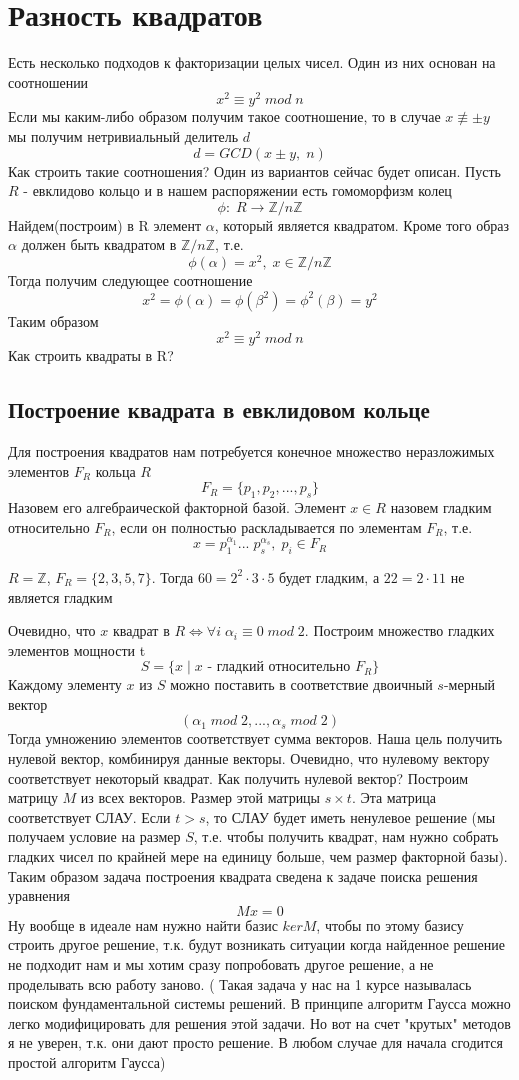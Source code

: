 \documentclass[oneside,final,14pt]{extreport}
\theoremstyle{plain}
\begin{document}
\chapter{Разность квадратов}
Есть несколько подходов к факторизации целых чисел. Один из них основан на соотношении $$x^2 \equiv y^2 \; mod \; n$$
Если мы каким-либо образом получим такое соотношение, то в случае $x \not \equiv \pm y$ мы получим нетривиальный делитель $d$
$$d=GCD(x \pm y,\; n)$$
Как строить такие соотношения? Один из вариантов сейчас будет описан. Пусть $R$ - евклидово кольцо и в нашем распоряжении есть гомоморфизм колец
$$
\phi: \; R \rightarrow {\mathbb{Z}}/{{n\mathbb{Z}}}
$$
Найдем(построим) в R элемент $\alpha$, который является квадратом. Кроме того образ $\alpha$ должен быть квадратом в $\mathbb{Z}/n\mathbb{Z}$, т.е. $$\phi(\alpha)=x^2,\; x \in \mathbb{Z}/n\mathbb{Z}$$
Тогда получим следующее соотношение
$$x^2=\phi(\alpha)=\phi(\beta^2)=\phi^2(\beta)=y^2$$
Таким образом $$x^2 \equiv y^2 \; mod \; n$$
Как строить квадраты в R?
\section{Построение квадрата в евклидовом кольце}
Для построения квадратов нам потребуется конечное множество неразложимых элементов $F_R$ кольца $R$
$$F_R=\{p_1,p_2,...,p_s\}$$ Назовем его алгебраической факторной базой. Элемент $x \in R$ назовем гладким относительно $F_R$, если он полностью раскладывается по элементам  $F_R$, т.е.
$$x=p_1^{\alpha_1}...\;p_s^{\alpha_s}, \; p_i \in F_R$$
\begin{remark*}
$R=\mathbb{Z}$,  $F_R=\{2,3,5,7\}$. Тогда $60=2^2 \cdot 3 \cdot 5$ будет гладким, а $22=2 \cdot 11$ не является гладким\end{remark*}Очевидно, что $x$ квадрат в $R \Leftrightarrow \forall i \;\alpha_i \equiv 0 \; mod \; 2$. Построим множество гладких элементов мощности t
$$S=\{x \; | \; x\text{ - гладкий относительно }F_R\}$$
Каждому элементу $x$ из $S$ можно поставить в соответствие двоичный $s$-мерный вектор
$$(\alpha_1 \; mod \; 2,...,\alpha_s \; mod \; 2)$$ Тогда умножению элементов соответствует сумма векторов. Наша цель получить нулевой вектор, комбинируя данные векторы. Очевидно, что нулевому вектору соответствует некоторый квадрат. Как получить нулевой вектор?
Построим матрицу $M$ из всех векторов. Размер этой матрицы $s \times t$. Эта матрица соответствует СЛАУ. Если $t>s$, то СЛАУ будет иметь ненулевое решение (мы получаем условие на размер $S$, т.е. чтобы получить квадрат, нам нужно собрать гладких чисел по крайней мере на единицу больше, чем размер факторной базы).
Таким образом задача построения квадрата сведена к задаче поиска решения уравнения $$Mx=0$$
Ну вообще в идеале нам нужно найти базис $ker M$, чтобы по этому базису строить другое решение, т.к. будут возникать ситуации когда найденное решение не подходит нам и мы хотим сразу попробовать другое решение, а не проделывать всю работу заново. ( Такая задача у нас на 1 курсе называлась поиском фундаментальной системы решений. В принципе алгоритм Гаусса можно легко модифицировать для решения этой задачи. Но вот на счет "крутых" методов я не уверен, т.к. они дают просто решение. В любом случае для начала сгодится простой алгоритм Гаусса)
\end{document}
